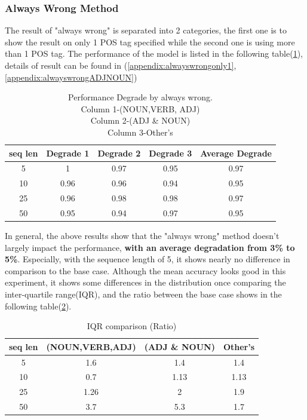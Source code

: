 \documentclass[12pt]{article}
\begin{document}
\subsubsection{Always Wrong Method}
The result of "always wrong" is separated into 2 categories, the first one is to show the result on only 1 POS tag specified while the second one is using more than 1 POS tag. The performance of the model is listed in the following table(\ref{tab:alwayswrongDegrade}), details of result can be found in (\ref{appendix:alwayswrongonly1},\ref{appendix:alwayswrongADJNOUN})  

\begin{table}[!h]
\fontsize{10pt}{10pt}\selectfont
\begin{tabular}{|c|c|c|c|c|}
\hline
seq len & Degrade 1 & Degrade 2 & Degrade 3 & Average Degrade \\ \hline
5       & 1         & 0.97      & 0.95     & 0.97 \\ \hline
10      & 0.96      & 0.96      & 0.94     & 0.95 \\ \hline
25      & 0.96      & 0.98      & 0.98     & 0.97  \\ \hline
50      & 0.95      & 0.94      & 0.97     & 0.95 \\ \hline
\end{tabular}
\caption{Performance Degrade by always wrong. \\
Column 1-(NOUN,VERB, ADJ)\\ 
Column 2-(ADJ \& NOUN)\\
Column 3-Other's}
\label{tab:alwayswrongDegrade}
\end{table}

In general, the above results show that the "always wrong" method doesn't largely impact the performance, \textbf{with an average degradation from 3\% to 5\%}. Especially, with the sequence length of 5, it shows nearly no difference in comparison to the base case. Although the mean accuracy looks good in this experiment, it shows some differences in the distribution once comparing the inter-quartile range(IQR), and the ratio between the base case shows in the following table(\ref{tab:alwayswrongIQR}).   
\begin{table}[!h]
\fontsize{10pt}{10pt}\selectfont
\begin{center}
\begin{tabular}{|c|c|c|c|}
\hline
seq len & (NOUN,VERB,ADJ) & (ADJ \& NOUN) & Other's \\ \hline
5       & 1.6             & 1.4         & 1.4    \\ \hline
10      & 0.7             & 1.13         & 1.13    \\ \hline
25      & 1.26            & 2            & 1.9     \\ \hline
50      & 3.7             & 5.3          & 1.7     \\ \hline
\end{tabular}
\caption{IQR comparison (Ratio) }
\label{tab:alwayswrongIQR}
\end{center}
\end{table}
\end{document}
